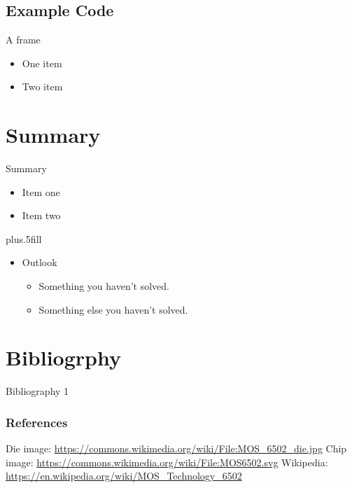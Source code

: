 \documentclass{beamer}
\begin{document}
\subsection[Examples]{Example Code}

\begin{frame}{A frame}
  \begin{itemize}
  \item
    One item
  \item
    Two item
  \end{itemize}
\end{frame}




\section{Summary}

\begin{frame}{Summary}

  \begin{itemize}
  \item
    Item one
  \item
    Item two
  \end{itemize}
  
  \vskip0pt plus.5fill
  \begin{itemize}
  \item
    Outlook
    \begin{itemize}
    \item
      Something you haven't solved.
    \item
      Something else you haven't solved.
    \end{itemize}
  \end{itemize}
\end{frame}

\section{Bibliogrphy}

\begin{frame}{Bibliography 1}
  \frametitle{References}

  \begin{thebibliography}{6502 Wikipedia Page}
    Die image: {\url{https://commons.wikimedia.org/wiki/File:MOS_6502_die.jpg}}
    Chip image: {\url{https://commons.wikimedia.org/wiki/File:MOS6502.svg}}
    Wikipedia: {\url{https://en.wikipedia.org/wiki/MOS_Technology_6502}}
  \end{thebibliography}
\end{frame}
\end{document}
